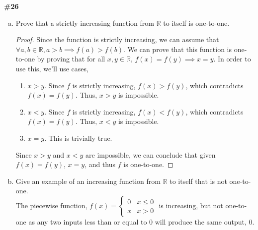 \documentclass{article}
\newcommand{\problem}[1]{\textbf{\##1}}
\newcommand{\prob}[1]{\problem{#1}}
\newcommand{\AllReals}{\mathbb{R}}
\begin{document}
\pagebreak
\prob{26}
\begin{enumerate}[a)]
    \item Prove that a strictly increasing function from \(\AllReals\) to itself is one-to-one.
    \begin{proof}
        Since the function is strictly increasing, we can assume that \(\forall a,b \in \AllReals, a > b \implies f(a) > f(b)\). We can prove that this function is one-to-one by proving that for all \(x, y \in \AllReals\), \(f(x) = f(y) \implies x = y\). In order to use this, we'll use cases,
        \begin{enumerate}
            \item \(x > y\). Since \(f\) is strictly increasing, \(f(x) > f(y)\), which contradicts \(f(x) = f(y)\). Thus, \(x > y\) is impossible.
            \item \(x < y\). Since \(f\) is strictly increasing, \(f(x) < f(y)\), which contradicts \(f(x) = f(y)\). Thus, \(x < y\) is impossible.
            \item \(x = y\). This is trivially true.
        \end{enumerate}
        Since \(x > y\) and \(x < y\) are impossible, we can conclude that given \(f(x) = f(y)\), \(x = y\), and thus \(f\) is one-to-one.
    \end{proof}
    \item Give an example of an increasing function from \(\AllReals\) to itself that is not one-to-one.\\
    The piecewise function, \(f(x) = \begin{cases} 
        0 & x\leq 0 \\
        x & x>0
     \end{cases}\) is increasing, but not one-to-one as any two inputs less than or equal to 0 will produce the same output, 0.
\end{enumerate}
\end{document}
